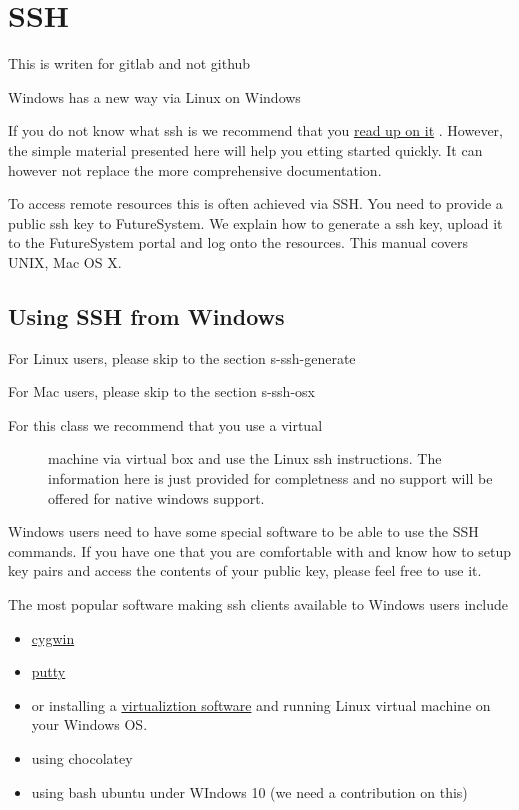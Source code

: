 \chapter{SSH}

\begin{WARNING}
This is writen for gitlab and not github
\end{WARNING}

\begin{WARNING}
Windows has a new way via Linux on Windows
\end{WARNING}


If you do not know what ssh is we recommend that you
\href{http://openssh.com/manual.html}{read up on it} . However, the
simple material presented here will help you etting started quickly. It
can however not replace the more comprehensive documentation.

To access remote resources this is often achieved via SSH. You need to
provide a public ssh key to FutureSystem. We explain how to generate a
ssh key, upload it to the FutureSystem portal and log onto the
resources. This manual covers UNIX, Mac OS X.

\section{Using SSH from Windows}\label{using-ssh-from-windows}

For Linux users, please skip to the section s-ssh-generate

For Mac users, please skip to the section s-ssh-osx

\begin{description}
\item[For this class we recommend that you use a virtual]
machine via virtual box and use the Linux ssh instructions. The
information here is just provided for completness and no support will be
offered for native windows support.
\end{description}

Windows users need to have some special software to be able to use the
SSH commands. If you have one that you are comfortable with and know how
to setup key pairs and access the contents of your public key, please
feel free to use it.

The most popular software making ssh clients available to Windows users
include

\begin{itemize}
\tightlist
\item
  \href{http://cygwin.com/install.html}{cygwin}
\item
  \href{http://the.earth.li/~sgtatham/putty/0.62/htmldoc/}{putty}
\item
  or installing a \href{http://cygwin.com/install.html}{virtualiztion
  software} and running Linux virtual machine on your Windows OS.
\item
  using chocolatey
\item
  using bash ubuntu under WIndows 10 (we need a contribution on this)
\end{itemize}

